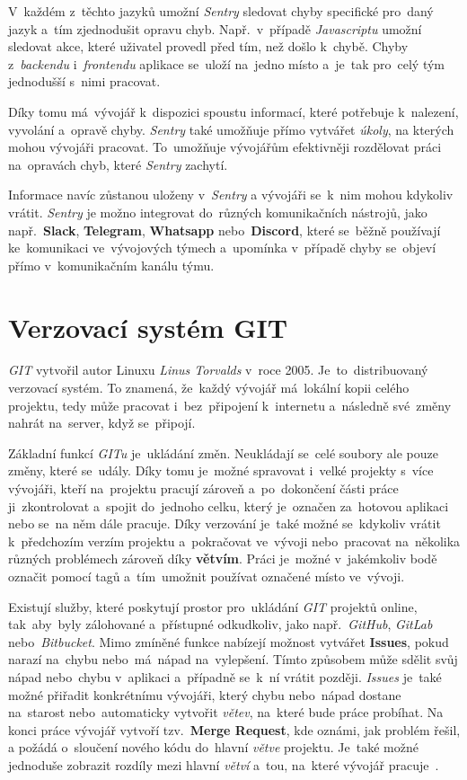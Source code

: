 \documentclass[11pt,a4paper]{report}
\begin{document}
                V~každém z~těchto jazyků umožní \emph{Sentry} sledovat chyby specifické pro~daný jazyk a~tím zjednodušit opravu chyb. Např.~v~případě \emph{Javascriptu} umožní sledovat akce, které uživatel provedl před tím, než došlo k~chybě. Chyby z~\emph{backendu} i~\emph{frontendu} aplikace se~uloží na~jedno místo a~je~tak pro~celý tým jednodušší s~nimi pracovat.

                Díky tomu má~vývojář k~dispozici spoustu informací, které potřebuje k~nalezení, vyvolání a~opravě chyby. \emph{Sentry} také umožňuje přímo vytvářet \emph{úkoly}, na kterých mohou vývojáři pracovat. To~umožňuje vývojářům efektivněji rozdělovat práci na~opravách chyb, které \emph{Sentry} zachytí.

                Informace navíc zůstanou uloženy v~\emph{Sentry} a vývojáři se~k~nim mohou kdykoliv vrátit. \emph{Sentry} je možno integrovat do~různých komunikačních nástrojů, jako např.~\textbf{Slack}, \textbf{Telegram}, \textbf{Whatsapp} nebo~\textbf{Discord}, které se~běžně používají ke~komunikaci ve~vývojových týmech a~upomínka v~případě chyby se~objeví přímo v~komunikačním kanálu týmu.
	
        \section{Verzovací systém GIT}
            \emph{GIT} vytvořil autor Linuxu \emph{Linus Torvalds} v~roce 2005. Je~to~distribuovaný verzovací systém. To znamená, že~každý vývojář má~lokální kopii celého projektu, tedy může pracovat i~bez~připojení k~internetu a~následně své~změny nahrát na~server, když se~připojí.
            
            Základní funkcí \emph{GITu} je~ukládání změn. Neukládají se~celé soubory ale pouze změny, které se~udály. Díky tomu je~možné spravovat i~velké projekty s~více vývojáři, kteří na~projektu pracují zároveň a~po~dokončení části práce ji~zkontrolovat a~spojit do~jednoho celku, který je~označen za~hotovou aplikaci nebo se~na něm dále pracuje. Díky verzování je~také možné se~kdykoliv vrátit k~předchozím verzím projektu a~pokračovat ve~vývoji nebo~pracovat na~několika různých problémech zároveň díky \textbf{větvím}. Práci je~možné v~jakémkoliv bodě označit pomocí tagů a~tím~umožnit používat označené místo ve~vývoji.

            Existují služby, které poskytují prostor pro~ukládání \emph{GIT} projektů online, tak~aby~byly zálohované a~přístupné odkudkoliv, jako např.~\emph{GitHub}, \emph{GitLab} nebo~\emph{Bitbucket}. Mimo zmíněné funkce nabízejí možnost vytvářet \textbf{Issues}, pokud narazí na~chybu nebo~má~nápad na~vylepšení. Tímto způsobem může sdělit svůj nápad nebo~chybu v~aplikaci a~případně se~k~ní vrátit později. \emph{Issues} je~také možné přiřadit konkrétnímu vývojáři, který chybu nebo~nápad dostane na~starost nebo~automaticky vytvořit \emph{větev}, na~které bude práce probíhat. Na konci práce vývojář vytvoří tzv.~\textbf{Merge Request}, kde oznámi, jak problém řešil, a požádá o~sloučení nového kódu do~hlavní \emph{větve} projektu. Je~také možné jednoduše zobrazit rozdíly mezi hlavní \emph{větví} a~tou, na~které vývojář pracuje~\cite{gitscmBook}.
            
\end{document}
